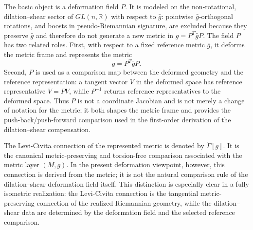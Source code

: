 \documentclass[12pt]{amsart}
\theoremstyle{definition}
\theoremstyle{remark}
\begin{document}
The basic object is a deformation field \(P\).  It is modeled on the non-rotational, dilation--shear sector of \(GL(n,\mathbb R)\) with respect to \(\bar g\): pointwise \(\bar g\)-orthogonal rotations, and boosts in pseudo-Riemannian signature, are excluded because they preserve \(\bar g\) and therefore do not generate a new metric in \(g=P^T\bar gP\).  The field \(P\) has two related roles.  First, with respect to a fixed reference metric \(\bar g\), it deforms the metric frame and represents the metric
\begin{equation}\label{eq:intro_metric}
 g=P^{T}\bar g P .
\end{equation}
Second, \(P\) is used as a comparison map between the deformed geometry and the reference representation: a tangent vector \(V\) in the deformed space has reference representative \(\bar V=PV\), while \(P^{-1}\) returns reference representatives to the deformed space.  Thus \(P\) is not a coordinate Jacobian and is not merely a change of notation for the metric; it both shapes the metric frame and provides the push-back/push-forward comparison used in the first-order derivation of the dilation--shear compensation.

The Levi-Civita connection of the represented metric is denoted by \(\mathring{\Gamma}[g]\).  It is the canonical metric-preserving and torsion-free comparison associated with the metric layer \((M,g)\).  In the present deformation viewpoint, however, this connection is derived from the metric; it is not the natural comparison rule of the dilation--shear deformation field itself.  This distinction is especially clear in a fully isometric realization: the Levi-Civita connection is the tangential metric-preserving connection of the realized Riemannian geometry, while the dilation--shear data are determined by the deformation field and the selected reference comparison.
\end{document}
